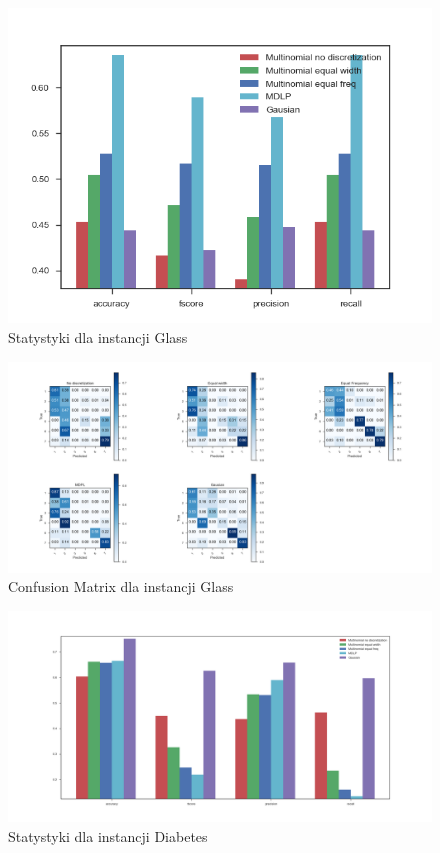 \documentclass[12pt,a4paper]{article}
\begin{document}
\begin{figure}[H]
\centering
\includegraphics[width=1\textwidth]{glassStats.png}
\caption{Statystyki dla instancji Glass}
\end{figure}

\begin{figure}[H]
\centering
\includegraphics[width=1\textwidth]{glassCM.png}
\caption{Confusion Matrix dla instancji Glass}
\end{figure}

\begin{figure}[H]
\centering
\includegraphics[width=1\textwidth]{diabetesStats.png}
\caption{Statystyki dla instancji Diabetes}
\end{figure}
\end{document}
